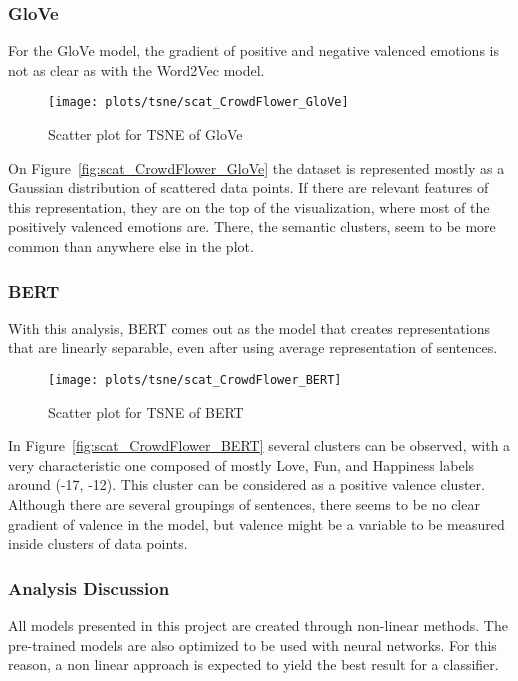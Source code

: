 \subsubsection{GloVe}
For the GloVe model, the gradient of positive and negative valenced emotions is not as clear as with the Word2Vec model.
\begin{figure}[H]
  \texttt{[image: plots/tsne/scat\_CrowdFlower\_GloVe]}
  \centering
  \caption{Scatter plot for TSNE of GloVe}
\end{figure}\label{fig:scat_CrowdFlower_GloVe}
On Figure~\ref{fig:scat_CrowdFlower_GloVe} the dataset is represented mostly as a Gaussian distribution of scattered data points. If there are relevant features of this representation, they are on the top of the visualization, where most of the positively valenced emotions are. There, the semantic clusters, seem to be more common than anywhere else in the plot.

\subsubsection{BERT}
With this analysis, BERT comes out as the model that creates representations that are linearly separable, even after using average representation of sentences.
\begin{figure}[H]
  \texttt{[image: plots/tsne/scat\_CrowdFlower\_BERT]}
  \centering
  \caption{Scatter plot for TSNE of BERT}
\end{figure}\label{fig:scat_CrowdFlower_BERT}
In Figure~\ref{fig:scat_CrowdFlower_BERT} several clusters can be observed, with a very characteristic one composed of mostly Love, Fun, and Happiness labels around (-17, -12). This cluster can be considered as a positive valence cluster. Although there are several groupings of sentences, there seems to be no clear gradient of valence in the model, but valence might be a variable to be measured inside clusters of data points.

\subsubsection{Analysis Discussion}
All models presented in this project are created through non-linear methods. The pre-trained models are also optimized to be used with neural networks. For this reason, a non linear approach is expected to yield the best result for a classifier.

